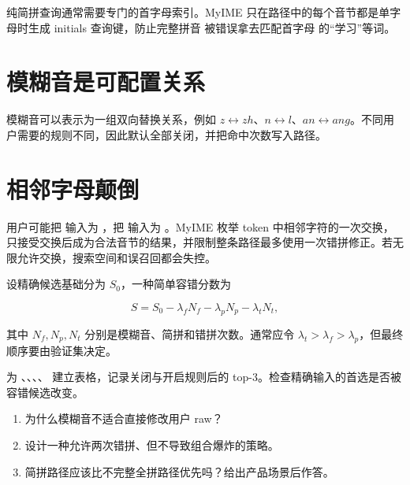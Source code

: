 纯简拼查询通常需要专门的首字母索引。MyIME 只在路径中的每个音节都是单字母时生成 initials 查询键，防止完整拼音  被错误拿去匹配首字母  的“学习”等词。



\section{模糊音是可配置关系}

模糊音可以表示为一组双向替换关系，例如 \(z\leftrightarrow zh\)、\(n\leftrightarrow l\)、\(an\leftrightarrow ang\)。不同用户需要的规则不同，因此默认全部关闭，并把命中次数写入路径。



\section{相邻字母颠倒}

用户可能把  输入为 ，把  输入为 。MyIME 枚举 token 中相邻字符的一次交换，只接受交换后成为合法音节的结果，并限制整条路径最多使用一次错拼修正。若无限允许交换，搜索空间和误召回都会失控。



设精确候选基础分为 \(S_0\)，一种简单容错分数为

\[
S=S_0-\lambda_fN_f-\lambda_pN_p-\lambda_tN_t,
\]

其中 \(N_f,N_p,N_t\) 分别是模糊音、简拼和错拼次数。通常应令 \(\lambda_t>\lambda_f>\lambda_p\)，但最终顺序要由验证集决定。

\begin{lab}[容错边界]
为 、、、、 建立表格，记录关闭与开启规则后的 top-3。检查精确输入的首选是否被容错候选改变。
\end{lab}

\exercises
\begin{enumerate}
  \item 为什么模糊音不适合直接修改用户 raw？
  \item 设计一种允许两次错拼、但不导致组合爆炸的策略。
  \item 简拼路径应该比不完整全拼路径优先吗？给出产品场景后作答。
\end{enumerate}

